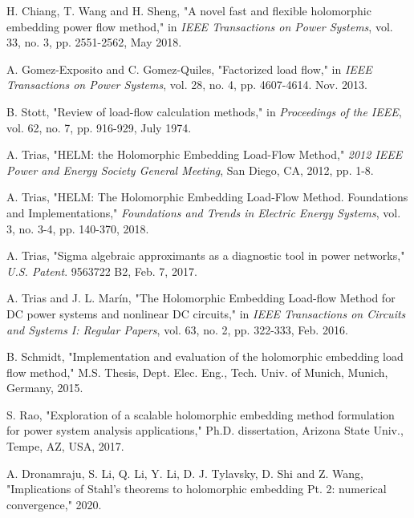 \documentclass[conference]{IEEEtran}
\begin{document}
\begin{thebibliography}{22}


H. Chiang, T. Wang and H. Sheng, "A novel fast and flexible holomorphic embedding power flow method," in \emph{IEEE Transactions on Power Systems}, vol. 33, no. 3, pp. 2551-2562, May 2018.

A. Gomez-Exposito and C. Gomez-Quiles, "Factorized load flow," in \emph{IEEE Transactions on Power Systems}, vol. 28, no. 4, pp. 4607-4614. Nov. 2013.

B. Stott, "Review of load-flow calculation methods," in \emph{Proceedings of the IEEE}, vol. 62, no. 7, pp. 916-929, July 1974. 

A. Trias, "HELM: the Holomorphic Embedding Load-Flow Method," \emph{2012 IEEE Power and Energy Society General Meeting}, San Diego, CA, 2012, pp. 1-8.

A. Trias, "HELM: The Holomorphic Embedding Load-Flow Method. Foundations and Implementations," \emph{Foundations and Trends\textsuperscript{\textregistered} in Electric Energy Systems}, vol. 3, no. 3-4, pp. 140-370, 2018.

A. Trias, "Sigma algebraic approximants as a diagnostic tool in power networks," \emph{U.S. Patent}. 9563722 B2, Feb. 7, 2017.

A. Trias and J. L. Marín, "The Holomorphic Embedding Load-flow Method for DC power systems and nonlinear DC circuits," in \emph{IEEE Transactions on Circuits and Systems I: Regular Papers}, vol. 63, no. 2, pp. 322-333, Feb. 2016.

B. Schmidt, "Implementation and evaluation of the holomorphic embedding load flow method," M.S. Thesis, Dept. Elec. Eng., Tech. Univ. of Munich, Munich, Germany, 2015.

\newpage
\IEEEtriggercmd{\enlargethispage{1in}}

S. Rao, "Exploration of a scalable holomorphic embedding method formulation for power system analysis applications," Ph.D. dissertation, Arizona State Univ., Tempe, AZ, USA, 2017.

A. Dronamraju, S. Li, Q. Li, Y. Li, D. J. Tylavsky, D. Shi and Z. Wang, "Implications of Stahl's theorems to holomorphic embedding Pt. 2: numerical convergence," 2020.


\end{thebibliography}
\end{document}
